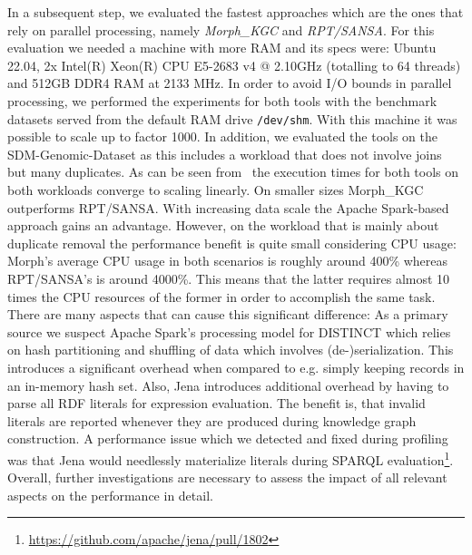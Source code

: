 In a subsequent step, we evaluated the fastest approaches which are the ones that rely on parallel processing, namely \emph{Morph\_KGC} and \emph{RPT/SANSA}.
For this evaluation we needed a machine with more RAM and its specs were: Ubuntu 22.04, 2x Intel(R) Xeon(R) CPU E5-2683 v4 @ 2.10GHz (totalling to 64 threads) and 512GB DDR4 RAM at 2133 MHz. In order to avoid I/O bounds in parallel processing, we performed the experiments for both tools with the benchmark datasets served from the default RAM drive \texttt{/dev/shm}.
With this machine it was possible to scale up to factor 1000.
In addition, we evaluated the tools on the SDM-Genomic-Dataset as this includes a workload that does not involve joins but many duplicates.
As can be seen from~ the execution times for both tools on both workloads converge to scaling linearly.
On smaller sizes Morph\_KGC outperforms RPT/SANSA. With increasing data scale the Apache Spark-based approach gains an advantage. However, on the workload that is mainly about duplicate removal the performance benefit is quite small considering CPU usage:
Morph's average CPU usage in both scenarios is roughly around 400\% whereas RPT/SANSA's is around 4000\%. This means that the latter requires almost 10 times the CPU resources of the former in order to accomplish the same task.
There are many aspects that can cause this significant difference: As a primary source we suspect Apache Spark's processing model for DISTINCT which relies on hash partitioning and shuffling of data which involves (de-)serialization. This introduces a significant overhead when compared to e.g. simply keeping records in an in-memory hash set. Also, Jena introduces additional overhead by having to parse all RDF literals for expression evaluation. 
The benefit is, that invalid literals are reported whenever they are produced during knowledge graph construction.
A performance issue which we detected and fixed during profiling was that Jena would needlessly materialize literals during SPARQL evaluation\footnote{\url{https://github.com/apache/jena/pull/1802}}. Overall, further investigations are necessary to assess the impact of all relevant aspects on the performance in detail.


